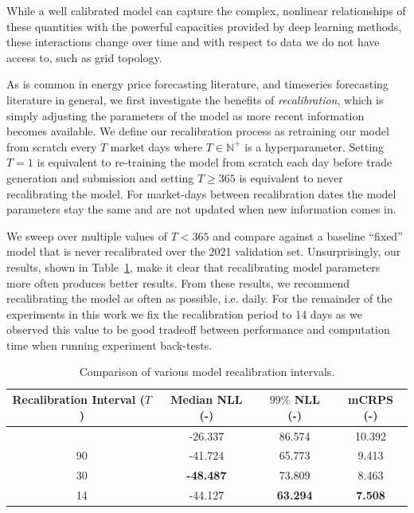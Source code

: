While a well calibrated model can capture the complex, nonlinear relationships of these quantities with the powerful
capacities provided by deep learning methods, these interactions change over time and with respect to data we do not
have access to, such as grid topology.

As is common in energy price forecasting literature, and timeseries forecasting literature in general, we first
investigate the benefits of \textit{recalibration}, which is simply adjusting the parameters of the model as more
recent information becomes available.
We define our recalibration process as retraining our model from scratch every $T$ market days where $T \in \mathbb{N}^+$
is a hyperparameter.
Setting $T=1$ is equivalent to re-training the model from scratch each day before trade generation and submission and
setting $T \geq 365$ is equivalent to never recalibrating the model.
For market-days between recalibration dates the model parameters stay the same and are not updated when new information
comes in.

We sweep over multiple values of $T < 365$ and compare against a baseline ``fixed'' model that is never recalibrated
over the 2021 validation set.
Unsurprisingly, our results, shown in Table~\ref{tab:recalibration}, make it clear that recalibrating model parameters
more often produces better results.
From these results, we recommend recalibrating the model as often as possible, i.e. daily.
For the remainder of the experiments in this work we fix the recalibration period to 14 days as we observed this
value to be good tradeoff between performance and computation time when running experiment back-tests.

\begin{table}[htb]
    \caption[Results of parameter recalibration]{
        Comparison of various model recalibration intervals.
    }
    \begin{center}
        \begin{tabular}{||c|c|c|c||} \hline
        Recalibration Interval ($T$) & Median NLL (-)  & $99\%$ NLL (-) & mCRPS (-)  \\	%
        \hline \hline
        \geq 365  &         -26.337  &         86.574  &        10.392  \\ \hline
        90        &         -41.724  &         65.773  &         9.413  \\ \hline
        30        & \textbf{-48.487} &         73.809  &         8.463  \\ \hline
        14        &         -44.127  & \textbf{63.294} & \textbf{7.508} \\ \hline
        \end{tabular}
        \\ \rule{0mm}{5mm}
    \end{center}
    \label{tab:recalibration}
\end{table}

